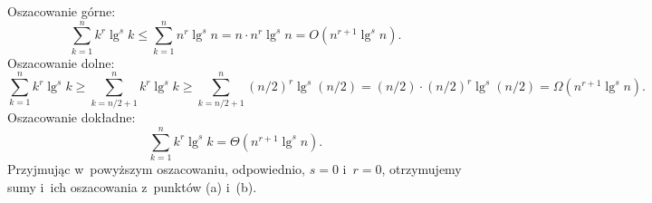 \subproblem %
Oszacowanie górne:
\[
    \sum_{k=1}^nk^r\lg^sk \le \sum_{k=1}^nn^r\lg^sn = n\cdot n^r\lg^sn = O(n^{r+1}\lg^sn).
\]
Oszacowanie dolne:
\[
    \sum_{k=1}^nk^r\lg^sk \ge \!\!\sum_{k=n/2+1}^n\!\!k^r\lg^sk \ge \!\!\sum_{k=n/2+1}^n\!\!(n/2)^r\lg^s(n/2) = (n/2)\cdot(n/2)^r\lg^s(n/2) = \Omega(n^{r+1}\lg^sn).
\]
Oszacowanie dokładne:
\[
    \sum_{k=1}^nk^r\lg^sk = \Theta(n^{r+1}\lg^sn).
\]
Przyjmując w~powyższym oszacowaniu, odpowiednio, $s=0$ i~$r=0$, otrzymujemy sumy i~ich oszacowania z~punktów (a) i~(b).

\endinput